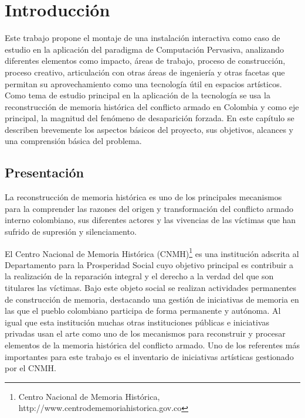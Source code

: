
\chapter{Introducción}

Este trabajo propone el montaje de una instalación interactiva como caso de estudio en la aplicación del paradigma de Computación Pervasiva\cite{RN1}, analizando diferentes elementos como impacto, áreas de trabajo, proceso de construcción, proceso creativo, articulación con otras áreas de ingeniería y otras facetas que permitan su aprovechamiento como una tecnología útil en espacios artísticos. Como tema de estudio principal en la aplicación de la tecnología se usa la reconstrucción de memoria histórica del conflicto armado en Colombia y como eje principal, la magnitud del fenómeno de desaparición forzada. En este capítulo se describen brevemente los aspectos básicos del proyecto, sus objetivos, alcances y una comprensión básica del problema.    

\section{Presentación}

La reconstrucción de memoria histórica es uno de los principales mecanismos para la comprender las razones del origen y transformación del conflicto armado interno colombiano, sus diferentes actores y las vivencias de las víctimas que han sufrido de supresión y silenciamento. 

El Centro Nacional de Memoria Histórica (CNMH)\footnote{Centro Nacional de Memoria Histórica, http://www.centrodememoriahistorica.gov.co} es una institución adscrita al Departamento para la Prosperidad Social cuyo objetivo principal es contribuir a la realización de la reparación integral y el derecho a la verdad del que son titulares las víctimas. Bajo este objeto social se realizan actividades permanentes de construcción de memoria, destacando una gestión de iniciativas de memoria en las que el pueblo colombiano participa de forma permanente y autónoma. Al igual que esta institución muchas otras instituciones públicas e iniciativas privadas usan el arte como uno de los mecanismos para reconstruir y procesar elementos de la memoria histórica del conflicto armado. Uno de los referentes más importantes para este trabajo es el inventario de iniciativas artísticas gestionado por el CNMH. 

